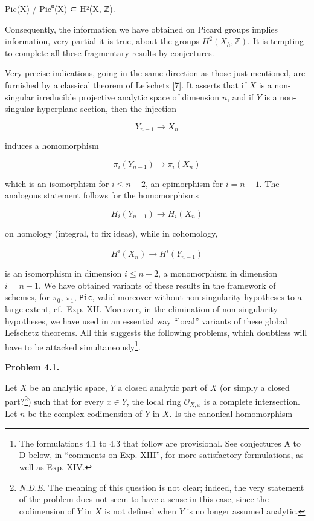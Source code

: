 \documentclass[
  11pt,
  a4paper,
]{book}
\newenvironment{Shaded}{}{}
\newcommand{\NormalTok}[1]{#1}
\begin{document}
\begin{Shaded}
\begin{Highlighting}[]
\NormalTok{Pic(X) / Pic⁰(X) ⊂ H²(X, ℤ).}
\end{Highlighting}
\end{Shaded}

Consequently, the information we have obtained on Picard groups implies
information, very partial it is true, about the groups
\(H^{2}(X_{h}, \mathbb{Z})\). It is tempting to complete all these
fragmentary results by conjectures.

Very precise indications, going in the same direction as those just
mentioned, are furnished by a classical theorem of Lefschetz {[}7{]}. It
asserts that if \(X\) is a non-singular irreducible projective analytic
space of dimension \(n\), and if \(Y\) is a non-singular hyperplane
section, then the injection

\[ Y_{n-1} \to X_{n} \]

induces a homomorphism

\[ \pi_{i}(Y_{n-1}) \to \pi_{i}(X_{n}) \]

which is an isomorphism for \(i \leqslant n - 2\), an epimorphism for
\(i = n - 1\). The analogous statement follows for the homomorphisms

\[ H_{i}(Y_{n-1}) \to H_{i}(X_{n}) \]

on homology (integral, to fix ideas), while in cohomology,

\[ H^{i}(X_{n}) \to H^{i}(Y_{n-1}) \]

is an isomorphism in dimension \(i \leqslant n - 2\), a monomorphism in
dimension \(i = n - 1\). We have obtained variants of these results in
the framework of schemes, for \(\pi_{0}\), \(\pi_{1}\), \texttt{Pic},
valid moreover without non-singularity hypotheses to a large extent,
cf.~Exp. XII. Moreover, in the elimination of non-singularity
hypotheses, we have used in an essential way ``local'' variants of these
global Lefschetz theorems. All this suggests the following problems,
which doubtless will have to be attacked simultaneously\footnote{The
  formulations 4.1 to 4.3 that follow are provisional. See conjectures A
  to D below, in ``comments on Exp. XIII'', for more satisfactory
  formulations, as well as Exp. XIV.}.

\textbf{Problem 4.1.}

Let \(X\) be an analytic space, \(Y\) a closed analytic part of \(X\)
(or simply a closed part?\footnote{\emph{N.D.E.} The meaning of this
  question is not clear; indeed, the very statement of the problem does
  not seem to have a sense in this case, since the codimension of \(Y\)
  in \(X\) is not defined when \(Y\) is no longer assumed analytic.})
such that for every \(x \in Y\), the local ring \(\mathcal{O}_{X,x}\) is
a complete intersection. Let \(n\) be the complex codimension of \(Y\)
in \(X\). Is the canonical homomorphism
\end{document}
